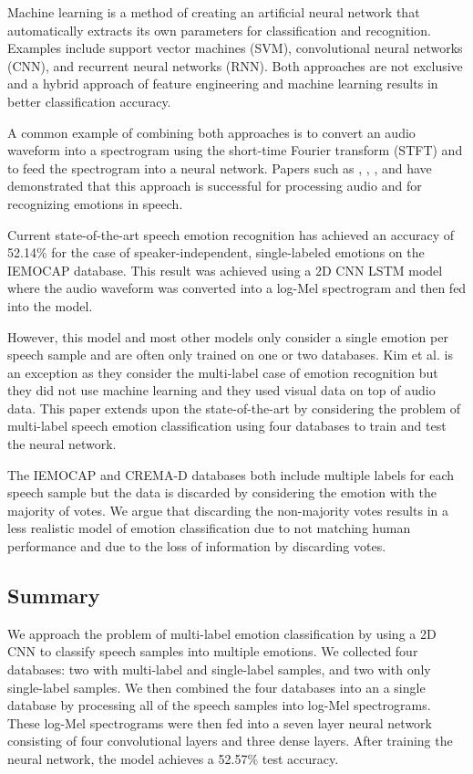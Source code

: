 \documentclass[conference]{IEEEtran}
\begin{document}
Machine learning is a method of creating an artificial neural network that automatically extracts its own parameters for classification and recognition. Examples include support vector machines (SVM), convolutional neural networks (CNN), and recurrent neural networks (RNN). Both approaches are not exclusive and a hybrid approach of feature engineering and machine learning results in better classification accuracy.\cite{Nassif2019}

A common example of combining both approaches is to convert an audio waveform into a spectrogram using the short-time Fourier transform (STFT) and to feed the spectrogram into a neural network. Papers such as \cite{Engel2019}, \cite{Chen2018}, \cite{Badshah2019}, and \cite{Zhao2019} have demonstrated that this approach is successful for processing audio and for recognizing emotions in speech.

Current state-of-the-art speech emotion recognition has achieved an accuracy of 52.14\% for the case of speaker-independent, single-labeled emotions on the IEMOCAP database.\cite{Zhao2019} This result was achieved using a 2D CNN LSTM model where the audio waveform was converted into a log-Mel spectrogram and then fed into the model.

However, this model and most other models only consider a single emotion per speech sample and are often only trained on one or two databases. Kim et al. \cite{Kim2018a} is an exception as they consider the multi-label case of emotion recognition but they did not use machine learning and they used visual data on top of audio data. This paper extends upon the state-of-the-art by considering the problem of multi-label speech emotion classification using four databases to train and test the neural network.

The IEMOCAP \cite{busso_2008} and CREMA-D \cite{cao_2014} databases both include multiple labels for each speech sample but the data is discarded by considering the emotion with the majority of votes. We argue that discarding the non-majority votes results in a less realistic model of emotion classification due to not matching human performance and due to the loss of information by discarding votes.

\subsection{Summary}

We approach the problem of multi-label emotion classification by using a 2D CNN to classify speech samples into multiple emotions. We collected four databases: two with multi-label and single-label samples, and two with only single-label samples. We then combined the four databases into an a single database by processing all of the speech samples into log-Mel spectrograms. These log-Mel spectrograms were then fed into a seven layer neural network consisting of four convolutional layers and three dense layers. After training the neural network, the model achieves a 52.57\% test accuracy.
\end{document}
